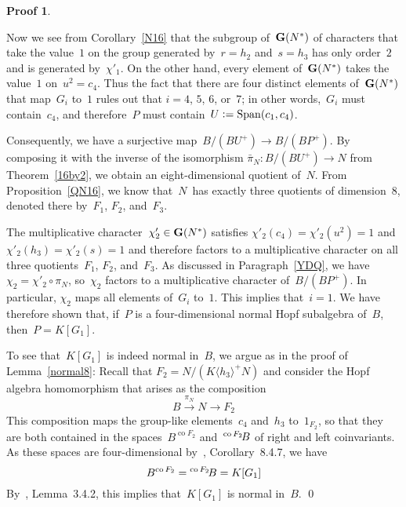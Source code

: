 \documentclass{article}
\newcounter{num}
\newenvironment{pflist}{\begin{list}{(\arabic{num})}{\usecounter{num} \leftmargin0cm \itemindent5pt}}{\end{list}}
\newcounter{num1}
\numberwithin{equation}{section}
\theoremstyle{definition}
\newtheorem*{pf}{Proof}
\theoremstyle{break}
\newcommand{\Span}{\operatorname{Span}}
\newcommand{\co}{\scriptstyle \operatorname{co}}
\newcommand{\deq}{\vcentcolon =}
\newcommand{\K}{1}
\newcommand{\1}{{(1)}}
\newcommand{\2}{{(2)}}
\newcommand{\3}{{(3)}}
\begin{document}
\begin{pf}
\begin{pflist}
Now we see from Corollary~\ref{N16} that the subgroup of~${\bf G}(N^*)$ of characters that take the value~$\K$ on the group generated by~$r=h_2$ and~$s=h_3$ has only order~$2$ and is generated by~$\chi'_1$. On the other hand, every element of~${\bf G}(N^*)$ takes the value~$\K$ on~$u^2=c_4$. Thus the fact that there are four distinct elements of~${\bf G}(N^*)$ that map~$G_i$ to~$\K$ rules out that $i=4$, $5$, $6$, or~$7$; in other words,~$G_i$ must contain~$c_4$, and therefore~$P$ must contain~$U \deq \Span(c_1, c_4)$.

\item
Consequently, we have a surjective map~$B/(BU^+) \to B/(BP^+)$. By composing it with the inverse of the isomorphism $\bar{\pi}_N \colon B/(BU^+) \to N$ from Theorem~\ref{16by2}, we obtain an eight-dimensional quotient of~$N$. From Proposition~\ref{QN16}, we know that~$N$~has exactly three quotients of dimension~$8$, denoted there by~$F_1$, $F_2$, and~$F_3$.

The multiplicative character~$\chi'_2 \in {\bf G}(N^*)$ satisfies
$\chi'_2(c_4) = \chi'_2(u^2) = \K$ and $\chi'_2(h_3) = \chi'_2(s) = \K$ and therefore factors to a multiplicative character on all three quotients~$F_1$, $F_2$, and~$F_3$. As discussed in Paragraph~\ref{YDQ}, we have \mbox{$\chi_2 = \chi'_2 \circ \pi_N$}, so~$\chi_2$ factors to a multiplicative character of~$B/(BP^+)$. In particular, $\chi_2$ maps all elements of~$G_i$ to~$\K$. This implies that~$i=1$. We have therefore shown that, if~$P$ is a four-dimensional normal Hopf subalgebra of~$B$, then~$P=K[G_1]$.

\item
\enlargethispage{4pt}
To see that~$K[G_1]$ is indeed normal in~$B$, we argue as in the proof of Lemma~\ref{normal8}: Recall that $F_2 = N/\left( K \langle h_3 \rangle^+ N \right)$ and consider the Hopf algebra homomorphism that arises as the composition
\[B \overset{\pi_N}{\to} N \to F_2\]
This composition maps the group-like elements~$c_4$ and~$h_3$ to~$1_{F_2}$, so that they are both contained in the spaces~$B^{\co F_2}$ and~$\prescript{\co F_2}{} \!B$ of right and left coinvariants. As these spaces are four-dimensional by~\cite{M}, Corollary~8.4.7, we have 
\[B^{\co F_2} = \prescript{\co F_2}{} \!B = K[G_1]\]
By~\cite{M}, Lemma~3.4.2, this implies that~$K[G_1]$ is normal in~$B$.
\qed
\end{pflist}
\end{pf}
\end{document}
